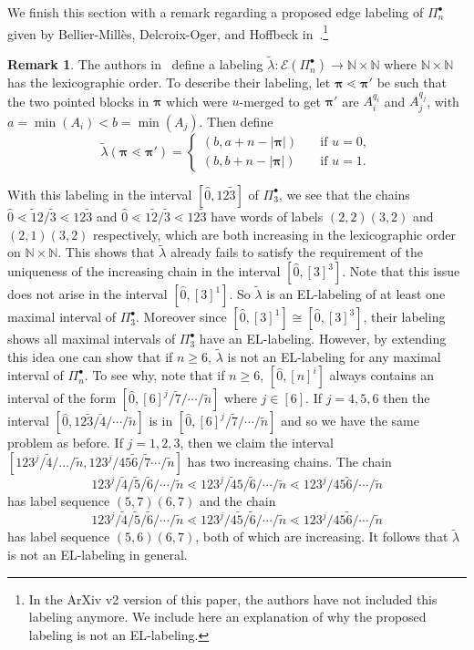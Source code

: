 \documentclass[11pt]{article}
\theoremstyle{definition}
\newtheorem{rema}[theo]{Remark}
\numberwithin{equation}{section}
\newcommand{\NN}{\mathbb{N}}
\newcommand{\cover}{\lessdot}
\newcommand{\bpi}{\pmb{\pi}}
\begin{document}
 
We finish this section with a remark regarding a proposed  edge labeling of $\Pi_n^\bullet$ given by Bellier-Mill{\`e}s, Delcroix-Oger, and Hoffbeck in~\cite {BelliermillesDelcroixogerHoffbeck2021}.\footnote{In the ArXiv v2 version of this paper, the authors have not included this labeling anymore. We include here an explanation of why the proposed labeling is not an EL-labeling.}


\begin{rema}\label{remark:proposed_EL_labeling} The authors in~\cite{BelliermillesDelcroixogerHoffbeck2021} define a labeling $\tilde \lambda:\mathcal{E}(\Pi_{n}^{\bullet})\rightarrow \NN\times \NN$ where  $\NN\times \NN$ has the lexicographic order. To describe their labeling, let $\bpi \lessdot \bpi'$ be such that the two pointed blocks in $\bpi$ which were $u$-merged to get $\bpi'$ are $A_i^{q_i}$ and $A_j^{q_j}$, with $a=\min(A_i)< b=\min(A_j)$. Then define 
$$\tilde \lambda(\bpi \lessdot \bpi')=  \begin{cases}
    (b,a+n-|\bpi|)       & \quad \text{if }u=0,\\
    (b,b+n-|\bpi|)  & \quad \text{if } u=1.
  \end{cases}$$
 
     With this labeling in the interval $[\hat{0},12\tilde{3}]$ of $\Pi_3^{\bullet}$, we see that the chains $\hat{0}\lessdot  \tilde{1}2/\tilde {3}\lessdot   12\tilde{3}$ and  $\hat{0}\lessdot 1\tilde{2}/ \tilde {3}\lessdot  12\tilde{3}$ have words of labels $(2,2)(3,2)$   and $(2,1)(3,2)$ respectively, which are both increasing in the lexicographic order on $\NN\times \NN$. This shows that $\tilde \lambda$ already fails to satisfy the requirement of the uniqueness of the increasing chain in the interval $[\hat{0},[3]^3]$.   Note that this issue does not arise in the interval $[\hat{0},[3]^1]$. So $\tilde \lambda$ is an EL-labeling of at least one maximal interval of $\Pi^{\bullet}_{3}$. Moreover since  $[\hat{0},[3]^1] \cong  [\hat{0},[3]^3]$,  their labeling shows all maximal intervals of $\Pi_{3}^\bullet$   have an EL-labeling.
     However, by extending this idea one can show that if $n\geq 6$, $\tilde \lambda$ is not an EL-labeling for any maximal interval of $\Pi_n^{\bullet}$.  To see why, note that if $n\geq 6$, $[\hat{0}, [n]^i]$ always contains an interval of the form $[\hat{0}, [6]^j/\tilde{7}/\cdots/ \tilde{n}]$ where $j\in [6]$.  If $j=4,5,6$ then the interval $[\hat{0}, 12\tilde{3}/\tilde{4}/\cdots/\tilde{n}]$   is in $[\hat{0}, [6]^j/\tilde{7}/\cdots/ \tilde{n}]$ and so we have the same problem as before. If $j=1,2,3$, then we claim the interval $[123^{j}/\tilde{4}/\dots /\tilde{n}, 123^j/45\tilde{6}/\tilde{7}\cdots/\tilde{n}]$ has two increasing chains.   The chain 
     $$
     123^{j}/\tilde{4}/\tilde{5}/\tilde{6}/\cdots /\tilde{n} \cover 123^{j}/\tilde{4}5/\tilde{6}/\cdots /\tilde{n} \cover 123^{j}/45\tilde{6}/\cdots /\tilde{n}
     $$
    has label sequence $(5,7)(6,7)$ and the chain
      $$
     123^{j}/\tilde{4}/\tilde{5}/\tilde{6}/\cdots /\tilde{n} \cover 123^{j}/4\tilde{5}/\tilde{6}/\cdots /\tilde{n} \cover 123^{j}/45\tilde{6}/\cdots /\tilde{n}
     $$
     has label sequence $(5,6)(6,7)$, both of which are increasing.  It follows that $\tilde \lambda$ is not an EL-labeling in general.
\end{rema}
\end{document}
